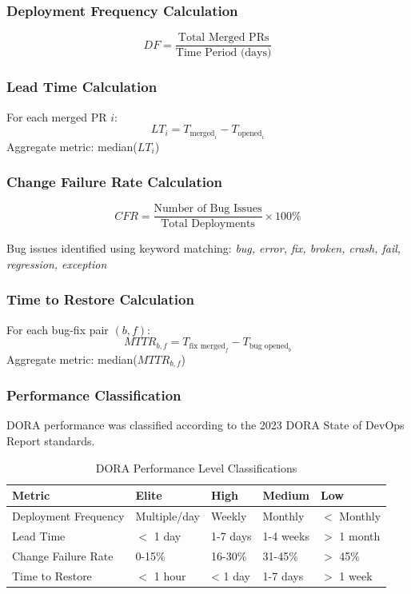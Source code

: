 \documentclass[12pt]{article}
\begin{document}
\subsubsection{Deployment Frequency Calculation}
\begin{equation}
  DF = \frac{\text{Total Merged PRs}}{\text{Time Period (days)}}
\end{equation}

\subsubsection{Lead Time Calculation}
For each merged PR $i$:
\begin{equation}
  LT_i = T_{\text{merged}_i} - T_{\text{opened}_i}
\end{equation}
Aggregate metric: median($LT_i$)

\subsubsection{Change Failure Rate Calculation}
\begin{equation}
  CFR = \frac{\text{Number of Bug Issues}}{\text{Total Deployments}}
  \times 100\%
\end{equation}

Bug issues identified using keyword matching: \textit{bug, error,
fix, broken, crash, fail, regression, exception}

\subsubsection{Time to Restore Calculation}
For each bug-fix pair $(b, f)$:
\begin{equation}
  MTTR_{b,f} = T_{\text{fix merged}_f} - T_{\text{bug opened}_b}
\end{equation}
Aggregate metric: median($MTTR_{b,f}$)

\subsubsection{Performance Classification}
DORA performance was classified according to the 2023 DORA State of
DevOps Report standards.

\begin{table}[H]
  \centering
  \caption{DORA Performance Level Classifications}
  \label{tab:dora-classification}
  \begin{tabular}{@{}lllll@{}}
    \toprule
    \textbf{Metric}      & \textbf{Elite} & \textbf{High} &
    \textbf{Medium} & \textbf{Low} \\ \midrule
    Deployment Frequency & Multiple/day   & Weekly        & Monthly
    & $<$ Monthly    \\
    Lead Time            & $<$ 1 day        & 1-7 days      & 1-4 weeks
    & $>$ 1 month    \\
    Change Failure Rate  & 0-15\%         & 16-30\%       & 31-45\%
    & $>$ 45\%       \\
    Time to Restore      & $<$ 1 hour       & < 1 day       & 1-7 days
    & $>$ 1 week     \\ \bottomrule
  \end{tabular}
\end{table}
\end{document}
